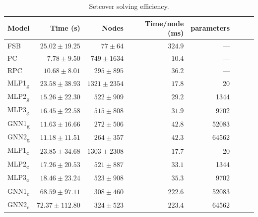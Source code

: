\begin{scriptsize}
\begin{table}[ht]
	\centering
	\begin{tabular}{lrrrrrrr}
		\toprule
		Model & Time (s) & Nodes  & Time/node (ms) & parameters \\
		\midrule
		FSB & $25.02 \pm  19.25$ & $77 \pm 64$ & $324.9$ & ---\\
		PC  & $7.78 \pm 9.50$ & $749 \pm 1634$ & $10.4$ & ---\\
		RPC & $10.68 \pm 8.01$ & $295 \pm 895$ & $36.2$ & ---\\
		\addlinespace
		MLP1\textsubscript{g} & $ 23.58 \pm  38.93$ &  $1321 \pm 2354$ &  $  17.8$& 20\\
		MLP2\textsubscript{g} & $15.26 \pm 22.30 $ &  $ 522 \pm  909 $ &  $  29.2$ & 1344\\
		MLP3\textsubscript{g} & $16.45 \pm 22.58$ & $515 \pm 808 $  & $31.9$ & 9702\\
		GNN1\textsubscript{g} & $11.63 \pm 16.66$ & $272 \pm 506 $  & $42.8$ & 52083\\
		GNN2\textsubscript{g} & $11.18 \pm 11.51$ & $264 \pm 357 $  & $42.3$ & 64562\\
		\addlinespace
		MLP1\textsubscript{c} & $23.85 \pm 34.68$ & $1303 \pm 2308$ & $17.7$ & 20\\
		MLP2\textsubscript{c} & $17.26 \pm 20.53$ & $521 \pm 887$   & $33.1$ & 1344\\
		MLP3\textsubscript{c} & $18.46 \pm 23.24$ & $523 \pm  908$  & $35.3$ & 9702\\
		GNN1\textsubscript{c} & $68.59 \pm 97.11$ & $308 \pm 460$   & $222.6$ & 52083\\
		GNN2\textsubscript{c} & $72.37 \pm 112.80$ & $324 \pm 523$  & $223.4$ & 64562\\
		\bottomrule
	\end{tabular}
	\caption{Setcover solving efficiency.}\label{tab:results1_set}
\end{table}
\end{scriptsize}

